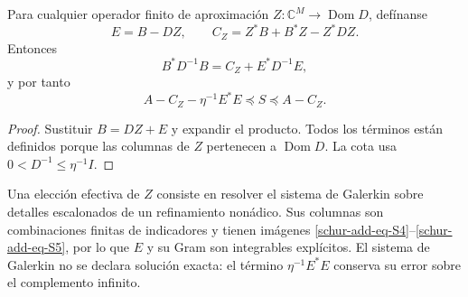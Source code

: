 \begin{theorem}
\label{schur-add-residual}
Para cualquier operador
finito de aproximación \(Z:\mathbb C^M\to\operatorname{Dom}D\), defínanse
\begin{equation}
E=B-DZ,\qquad C_Z=Z^*B+B^*Z-Z^*DZ.
\label{schur-add-display-15}
\end{equation}
Entonces
\begin{equation}
B^*D^{-1}B=C_Z+E^*D^{-1}E,
\label{schur-add-display-16}
\end{equation}
y por tanto
\begin{equation}
\boxed{A-C_Z-\eta^{-1}E^*E\preceq S\preceq A-C_Z.}
\label{schur-add-eq-S7}
\end{equation}
\end{theorem}
\begin{proof}
Sustituir \(B=DZ+E\) y expandir el producto. Todos los
términos están definidos porque las columnas de \(Z\) pertenecen a
\(\operatorname{Dom}D\). La cota usa \(0<D^{-1}\leq\eta^{-1}I\).
\end{proof}

Una elección efectiva de \(Z\) consiste en resolver el sistema de
Galerkin sobre detalles escalonados de un refinamiento nonádico. Sus
columnas son combinaciones finitas de indicadores y tienen imágenes
\eqref{schur-add-eq-S4}--\eqref{schur-add-eq-S5}, por lo que \(E\) y su Gram son integrables explícitos. El
sistema de Galerkin no se declara solución exacta: el término
\(\eta^{-1}E^*E\) conserva su error sobre el complemento infinito.


